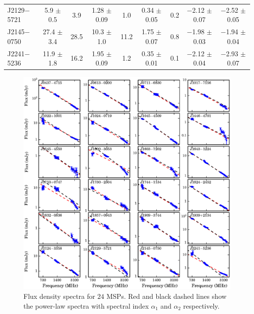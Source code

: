\documentclass[useAMS,usenatbib]{mn2e}
\begin{document}
\begin{table}
\begin{tabular}{lcccccccc}
 J2129$-$5721  &  5.9   $\pm$ 0.5  &  3.9   &  1.28  $\pm$ 0.09 &  1.0  &  0.34 $\pm$ 0.05 &  0.2   &  $-$2.12 $\pm$ 0.07 &  $-$2.52 $\pm$ 0.05 \\ 
 J2145$-$0750  &  27.4  $\pm$ 3.4  &  28.5  &  10.3  $\pm$ 1.0  &  11.2 &  1.75 $\pm$ 0.07 &  0.8   &  $-$1.98 $\pm$ 0.03 &  $-$1.94 $\pm$ 0.04 \\ 
 J2241$-$5236  &  11.9  $\pm$ 1.8  &  16.2  &  1.95  $\pm$ 0.09 &  1.2  &  0.35 $\pm$ 0.01 &  0.1   &  $-$2.12 $\pm$ 0.04 &  $-$2.93 $\pm$ 0.07 \\ 
\hline
\end{tabular}
\end{table}

\begin{figure}
\begin{center}
\includegraphics[width=6 in]{specIndex.ps}
\caption{Flux density spectra for $24$ MSPs. Red and black dashed lines show the power-law 
spectra with spectral index $\alpha_1$ and $\alpha_2$ respectively.} 
\label{index}
\end{center}
\end{figure}
\end{document}
